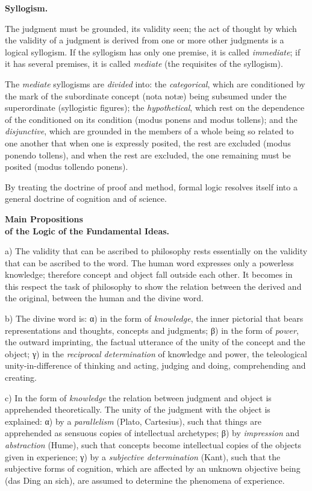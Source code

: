 \documentclass[12pt,a4paper,openany]{book}
\newcommand{\opage}[1]{\marginnote{\footnotesize\textit{[#1]}}}
\begin{document}
\begin{center}\textbf{Syllogism.}\end{center}

The judgment must be grounded, its validity seen; the act of thought by which the validity of a judgment is derived
from one or more other judgments is a logical syllogism. If the syllogism has only one premise, it is called
\emph{immediate}; if it has several premises, it is called \emph{mediate} (the requisites of the syllogism).

The \emph{mediate} syllogisms are \emph{divided} into: the \emph{categorical}, which are conditioned by the mark of
the subordinate concept (nota notæ) being subsumed under the superordinate (syllogistic figures); the
\emph{hypothetical}, which rest on the dependence of the conditioned on its condition (modus ponens and modus
tollens); and the \emph{disjunctive}, which are grounded in the members of a whole being so related to one another
that when one is expressly posited, the rest are excluded (modus ponendo tollens), and when the rest are excluded, the
one remaining must be posited (modus tollendo ponens).

By treating the doctrine of proof and method, formal logic resolves itself into a general doctrine of cognition and
of science.

\opage{4}\begin{center}\textbf{Main Propositions}\\
\textbf{of the Logic of the Fundamental Ideas.}\end{center}

a) The validity that can be ascribed to philosophy rests essentially on the validity that can be ascribed to the word.
The human word expresses only a powerless knowledge; therefore concept and object fall outside each other. It becomes
in this respect the task of philosophy to show the relation between the derived and the original, between the human
and the divine word.

b) The divine word is: α) in the form of \emph{knowledge}, the inner pictorial that bears representations and
thoughts, concepts and judgments; β) in the form of \emph{power}, the outward imprinting, the factual utterance of the
unity of the concept and the object; γ) in the \emph{reciprocal determination} of knowledge and power, the
teleological unity-in-difference of thinking and acting, judging and doing, comprehending and creating.

c) In the form of \emph{knowledge} the relation between judgment and object is apprehended theoretically. The unity
of the judgment with the object is explained: α) by a \emph{parallelism} (Plato, Cartesius), such that things are
apprehended as sensuous copies of intellectual archetypes; β) by \emph{impression} and \emph{abstraction} (Hume), such
that concepts become intellectual copies of the objects given in experience; γ) by a \emph{subjective determination}
(Kant), such that the subjective forms of cognition, which are affected by an unknown objective being (das Ding an
sich), are assumed to determine the phenomena of experience.
\end{document}
